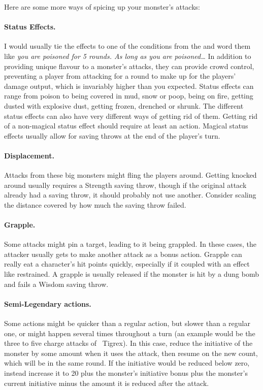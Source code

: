 Here are some more ways of spicing up your monster's attacks:
\paragraph{Status Effects.} I would usually tie the effects to one of the conditions from the \PHB{} and word them like \emph{you are poisoned for 5 rounds. As long as you are poisoned\ldots} In addition to providing unique flavour to a monster's attacks, they can provide crowd control, preventing a player from attacking for a round to make up for the players' damage output, which is invariably higher than you expected. Status effects can range from poison to being covered in mud, snow or poop, being on fire, getting dusted with explosive dust, getting frozen, drenched or shrunk. The different status effects can also have very different ways of getting rid of them. Getting rid of a non-magical status effect should require at least an action. Magical status effects usually allow for saving throws at the end of the player's turn.
\paragraph{Displacement.} Attacks from these big monsters might fling the players around. Getting knocked around usually requires a Strength saving throw, though if the original attack already had a saving throw, it should probably not use another. Consider scaling the distance covered by how much the saving throw failed.
\paragraph{Grapple.} Some attacks might pin a target, leading to it being grappled. In these cases, the attacker usually gets to make another attack as a bonus action. Grapple can really eat a character's hit points quickly, especially if it coupled with an effect like restrained. A grapple is usually released if the monster is hit by a dung bomb and fails a Wisdom saving throw.
\paragraph{Semi-Legendary actions.} Some actions might be quicker than a regular action, but slower than a regular one, or might happen several times throughout a turn (an example would be the three to five charge attacks of ~Tigrex). In this case, reduce the initiative of the monster by some amount when it uses the attack, then resume on the new count, which will be in the same round. If the initiative would be reduced below zero, instead increase it to 20 plus the monster's initiative bonus plus the monster's current initiative minus the amount it is reduced after the attack.

